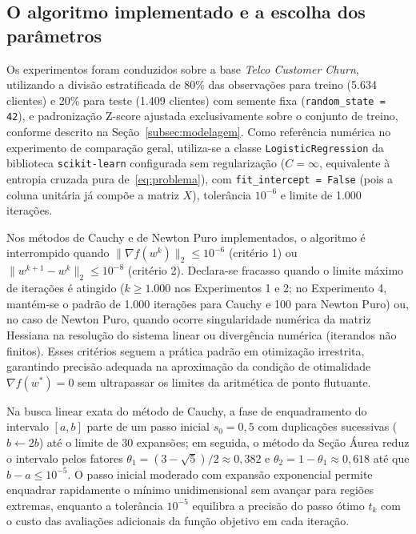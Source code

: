 \documentclass{article}
\theoremstyle{remark}
\begin{document}
\subsection{O algoritmo implementado e a escolha dos parâmetros}

Os experimentos foram conduzidos sobre a base \textit{Telco Customer Churn}, utilizando a divisão estratificada de 80\% das observações para treino (5.634 clientes) e 20\% para teste (1.409 clientes) com semente fixa (\texttt{random\_state = 42}), e padronização Z-score ajustada exclusivamente sobre o conjunto de treino, conforme descrito na Seção~\ref{subsec:modelagem}. Como referência numérica no experimento de comparação geral, utiliza-se a classe \texttt{LogisticRegression} da biblioteca \texttt{scikit-learn} configurada sem regularização ($C = \infty$, equivalente à entropia cruzada pura de~\eqref{eq:problema}), com \texttt{fit\_intercept = False} (pois a coluna unitária já compõe a matriz $X$), tolerância $10^{-6}$ e limite de 1.000 iterações.

Nos métodos de Cauchy e de Newton Puro implementados, o algoritmo é interrompido quando $\|\nabla f(w^k)\|_2 \le 10^{-6}$ (critério 1) ou $\|w^{k+1} - w^k\|_2 \le 10^{-8}$ (critério 2). Declara-se fracasso quando o limite máximo de iterações é atingido ($k \ge 1.000$ nos Experimentos 1 e 2; no Experimento 4, mantém-se o padrão de 1.000 iterações para Cauchy e 100 para Newton Puro) ou, no caso de Newton Puro, quando ocorre singularidade numérica da matriz Hessiana na resolução do sistema linear ou divergência numérica (iterandos não finitos). Esses critérios seguem a prática padrão em otimização irrestrita, garantindo precisão adequada na aproximação da condição de otimalidade $\nabla f(w^*) = 0$ sem ultrapassar os limites da aritmética de ponto flutuante.

Na busca linear exata do método de Cauchy, a fase de enquadramento do intervalo $[a, b]$ parte de um passo inicial $s_0 = 0{,}5$ com duplicações sucessivas ($b \leftarrow 2b$) até o limite de 30 expansões; em seguida, o método da Seção Áurea reduz o intervalo pelos fatores $\theta_1 = (3 - \sqrt{5})/2 \approx 0{,}382$ e $\theta_2 = 1 - \theta_1 \approx 0{,}618$ até que $b - a \le 10^{-5}$. O passo inicial moderado com expansão exponencial permite enquadrar rapidamente o mínimo unidimensional sem avançar para regiões extremas, enquanto a tolerância $10^{-5}$ equilibra a precisão do passo ótimo $t_k$ com o custo das avaliações adicionais da função objetivo em cada iteração.
\end{document}
